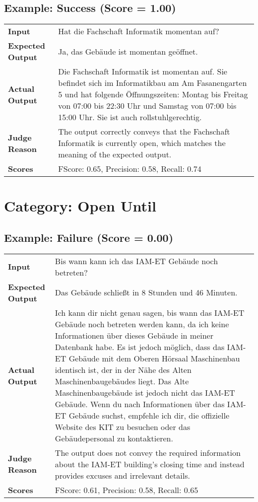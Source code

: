 \documentclass{article}
\begin{document}
\subsection*{Example: Success (Score = 1.00)}
\begin{longtable}{p{} p{}}
\textbf{Input} & Hat die Fachschaft Informatik momentan auf? \\
\textbf{Expected Output} & Ja, das Gebäude ist momentan geöffnet. \\
\textbf{Actual Output} & Die Fachschaft Informatik ist momentan auf. Sie befindet sich im Informatikbau am Am Fasanengarten 5 und hat folgende Öffnungszeiten: Montag bis Freitag von 07:00 bis 22:30 Uhr und Samstag von 07:00 bis 15:00 Uhr. Sie ist auch rollstuhlgerechtig. \\
\textbf{Judge Reason} & The output correctly conveys that the Fachschaft Informatik is currently open, which matches the meaning of the expected output. \\
\textbf{Scores} & FScore: 0.65, Precision: 0.58, Recall: 0.74 \\
\end{longtable}
\section*{Category: Open Until}
\subsection*{Example: Failure (Score = 0.00)}
\begin{longtable}{p{} p{}}
\textbf{Input} & Bis wann kann ich das IAM-ET Gebäude noch betreten? \\
\textbf{Expected Output} & Das Gebäude schließt in 8 Stunden und 46 Minuten. \\
\textbf{Actual Output} & Ich kann dir nicht genau sagen, bis wann das IAM-ET Gebäude noch betreten werden kann, da ich keine Informationen über dieses Gebäude in meiner Datenbank habe. Es ist jedoch möglich, dass das IAM-ET Gebäude mit dem Oberen Hörsaal Maschinenbau identisch ist, der in der Nähe des Alten Maschinenbaugebäudes liegt. Das Alte Maschinenbaugebäude ist jedoch nicht das IAM-ET Gebäude. Wenn du nach Informationen über das IAM-ET Gebäude suchst, empfehle ich dir, die offizielle Website des KIT zu besuchen oder das Gebäudepersonal zu kontaktieren. \\
\textbf{Judge Reason} & The output does not convey the required information about the IAM-ET building's closing time and instead provides excuses and irrelevant details. \\
\textbf{Scores} & FScore: 0.61, Precision: 0.58, Recall: 0.65 \\
\end{longtable}
\end{document}
